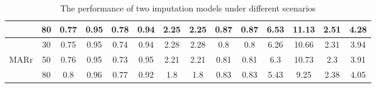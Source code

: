\documentclass[12pt, fullpage, a4paper]{article}
\begin{document}
\begin{table}
\begin{tabular}{cc|cccc|cccc|cccc}
		\multicolumn{1}{c|}{}     & 80                    & 0.77                       & 0.95                       & 0.78                       & 0.94                        & 2.25                       & 2.25                       & 0.87                       & 0.87                        & 6.53                       & 11.13                      & 2.51                       & 4.28                       \\\hline
		\multicolumn{1}{c|}{}     & 30                    & 0.75                       & 0.95                       & 0.74                       & 0.94                        & 2.28                       & 2.28                       & 0.8                        & 0.8                         & 6.26                       & 10.66                      & 2.31                       & 3.94                       \\
		\multicolumn{1}{c|}{MARr} & 50                    & 0.76                       & 0.95                       & 0.73                       & 0.95                        & 2.21                       & 2.21                       & 0.81                       & 0.81                        & 6.3                        & 10.73                      & 2.3                        & 3.91                       \\
		\multicolumn{1}{c|}{}     & 80                    & 0.8                        & 0.96                       & 0.77                       & 0.92                        & 1.8                        & 1.8                        & 0.83                       & 0.83                        & 5.43                       & 9.25                       & 2.38                       & 4.05                      
	\end{tabular}
	\caption{The performance of two imputation models under different scenarios}
	\label{tab1}
\end{table}
\end{document}
